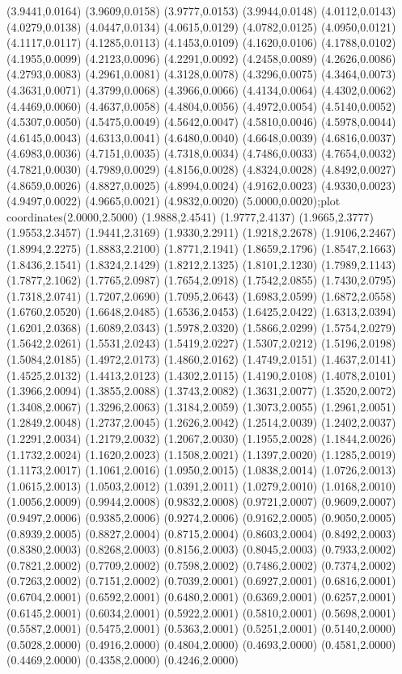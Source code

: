 {(3.9441,0.0164) (3.9609,0.0158) (3.9777,0.0153) (3.9944,0.0148) (4.0112,0.0143) (4.0279,0.0138) (4.0447,0.0134) (4.0615,0.0129) (4.0782,0.0125) (4.0950,0.0121) (4.1117,0.0117) (4.1285,0.0113) (4.1453,0.0109) (4.1620,0.0106) (4.1788,0.0102) (4.1955,0.0099) (4.2123,0.0096) (4.2291,0.0092) (4.2458,0.0089) (4.2626,0.0086) (4.2793,0.0083) (4.2961,0.0081) (4.3128,0.0078) (4.3296,0.0075) (4.3464,0.0073) (4.3631,0.0071) (4.3799,0.0068) (4.3966,0.0066) (4.4134,0.0064) (4.4302,0.0062) (4.4469,0.0060) (4.4637,0.0058) (4.4804,0.0056) (4.4972,0.0054) (4.5140,0.0052) (4.5307,0.0050) (4.5475,0.0049) (4.5642,0.0047) (4.5810,0.0046) (4.5978,0.0044) (4.6145,0.0043) (4.6313,0.0041) (4.6480,0.0040) (4.6648,0.0039) (4.6816,0.0037) (4.6983,0.0036) (4.7151,0.0035) (4.7318,0.0034) (4.7486,0.0033) (4.7654,0.0032) (4.7821,0.0030) (4.7989,0.0029) (4.8156,0.0028) (4.8324,0.0028) (4.8492,0.0027) (4.8659,0.0026) (4.8827,0.0025) (4.8994,0.0024) (4.9162,0.0023) (4.9330,0.0023) (4.9497,0.0022) (4.9665,0.0021) (4.9832,0.0020) (5.0000,0.0020)};plot coordinates{(2.0000,2.5000) (1.9888,2.4541) (1.9777,2.4137) (1.9665,2.3777) (1.9553,2.3457) (1.9441,2.3169) (1.9330,2.2911) (1.9218,2.2678) (1.9106,2.2467) (1.8994,2.2275) (1.8883,2.2100) (1.8771,2.1941) (1.8659,2.1796) (1.8547,2.1663) (1.8436,2.1541) (1.8324,2.1429) (1.8212,2.1325) (1.8101,2.1230) (1.7989,2.1143) (1.7877,2.1062) (1.7765,2.0987) (1.7654,2.0918) (1.7542,2.0855) (1.7430,2.0795) (1.7318,2.0741) (1.7207,2.0690) (1.7095,2.0643) (1.6983,2.0599) (1.6872,2.0558) (1.6760,2.0520) (1.6648,2.0485) (1.6536,2.0453) (1.6425,2.0422) (1.6313,2.0394) (1.6201,2.0368) (1.6089,2.0343) (1.5978,2.0320) (1.5866,2.0299) (1.5754,2.0279) (1.5642,2.0261) (1.5531,2.0243) (1.5419,2.0227) (1.5307,2.0212) (1.5196,2.0198) (1.5084,2.0185) (1.4972,2.0173) (1.4860,2.0162) (1.4749,2.0151) (1.4637,2.0141) (1.4525,2.0132) (1.4413,2.0123) (1.4302,2.0115) (1.4190,2.0108) (1.4078,2.0101) (1.3966,2.0094) (1.3855,2.0088) (1.3743,2.0082) (1.3631,2.0077) (1.3520,2.0072) (1.3408,2.0067) (1.3296,2.0063) (1.3184,2.0059) (1.3073,2.0055) (1.2961,2.0051) (1.2849,2.0048) (1.2737,2.0045) (1.2626,2.0042) (1.2514,2.0039) (1.2402,2.0037) (1.2291,2.0034) (1.2179,2.0032) (1.2067,2.0030) (1.1955,2.0028) (1.1844,2.0026) (1.1732,2.0024) (1.1620,2.0023) (1.1508,2.0021) (1.1397,2.0020) (1.1285,2.0019) (1.1173,2.0017) (1.1061,2.0016) (1.0950,2.0015) (1.0838,2.0014) (1.0726,2.0013) (1.0615,2.0013) (1.0503,2.0012) (1.0391,2.0011) (1.0279,2.0010) (1.0168,2.0010) (1.0056,2.0009) (0.9944,2.0008) (0.9832,2.0008) (0.9721,2.0007) (0.9609,2.0007) (0.9497,2.0006) (0.9385,2.0006) (0.9274,2.0006) (0.9162,2.0005) (0.9050,2.0005) (0.8939,2.0005) (0.8827,2.0004) (0.8715,2.0004) (0.8603,2.0004) (0.8492,2.0003) (0.8380,2.0003) (0.8268,2.0003) (0.8156,2.0003) (0.8045,2.0003) (0.7933,2.0002) (0.7821,2.0002) (0.7709,2.0002) (0.7598,2.0002) (0.7486,2.0002) (0.7374,2.0002) (0.7263,2.0002) (0.7151,2.0002) (0.7039,2.0001) (0.6927,2.0001) (0.6816,2.0001) (0.6704,2.0001) (0.6592,2.0001) (0.6480,2.0001) (0.6369,2.0001) (0.6257,2.0001) (0.6145,2.0001) (0.6034,2.0001) (0.5922,2.0001) (0.5810,2.0001) (0.5698,2.0001) (0.5587,2.0001) (0.5475,2.0001) (0.5363,2.0001) (0.5251,2.0001) (0.5140,2.0000) (0.5028,2.0000) (0.4916,2.0000) (0.4804,2.0000) (0.4693,2.0000) (0.4581,2.0000) (0.4469,2.0000) (0.4358,2.0000) (0.4246,2.0000) }
